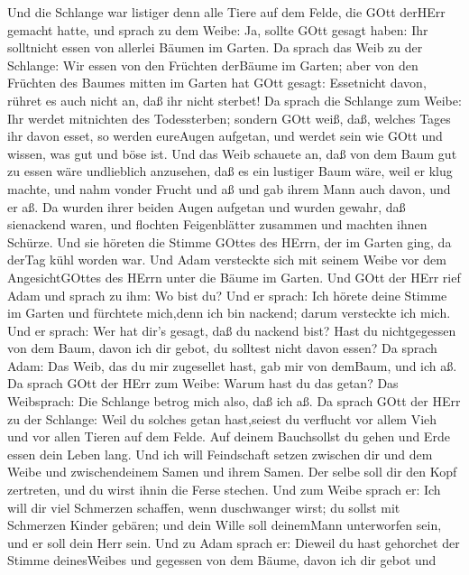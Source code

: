  Und die Schlange war listiger denn alle Tiere auf dem
Felde, die GOtt derHErr gemacht hatte, und sprach zu dem Weibe: Ja,
sollte GOtt gesagt haben: Ihr solltnicht essen von allerlei Bäumen im
Garten.  Da sprach das Weib zu der Schlange: Wir essen von
den Früchten derBäume im Garten;  aber von den Früchten des
Baumes mitten im Garten hat GOtt gesagt: Essetnicht davon, rühret es
auch nicht an, daß ihr nicht sterbet!  Da sprach die
Schlange zum Weibe: Ihr werdet mitnichten des Todessterben; 
sondern GOtt weiß, daß, welches Tages ihr davon esset, so werden
eureAugen aufgetan, und werdet sein wie GOtt und wissen, was gut und
böse ist.  Und das Weib schauete an, daß von dem Baum gut zu
essen wäre undlieblich anzusehen, daß es ein lustiger Baum wäre, weil er
klug machte, und nahm vonder Frucht und aß und gab ihrem Mann auch
davon, und er aß.  Da wurden ihrer beiden Augen aufgetan und
wurden gewahr, daß sienackend waren, und flochten Feigenblätter zusammen
und machten ihnen Schürze.  Und sie höreten die Stimme
GOttes des HErrn, der im Garten ging, da derTag kühl worden war. Und
Adam versteckte sich mit seinem Weibe vor dem AngesichtGOttes des HErrn
unter die Bäume im Garten.  Und GOtt der HErr rief Adam und
sprach zu ihm: Wo bist du?  Und er sprach: Ich hörete deine
Stimme im Garten und fürchtete mich,denn ich bin nackend; darum
versteckte ich mich.  Und er sprach: Wer hat dir's gesagt,
daß du nackend bist? Hast du nichtgegessen von dem Baum, davon ich dir
gebot, du solltest nicht davon essen?  Da sprach Adam: Das
Weib, das du mir zugesellet hast, gab mir von demBaum, und ich aß.
 Da sprach GOtt der HErr zum Weibe: Warum hast du das
getan? Das Weibsprach: Die Schlange betrog mich also, daß ich aß.
 Da sprach GOtt der HErr zu der Schlange: Weil du solches
getan hast,seiest du verflucht vor allem Vieh und vor allen Tieren auf
dem Felde. Auf deinem Bauchsollst du gehen und Erde essen dein Leben
lang.  Und ich will Feindschaft setzen zwischen dir und dem
Weibe und zwischendeinem Samen und ihrem Samen. Der selbe soll dir den
Kopf zertreten, und du wirst ihnin die Ferse stechen.  Und
zum Weibe sprach er: Ich will dir viel Schmerzen schaffen, wenn
duschwanger wirst; du sollst mit Schmerzen Kinder gebären; und dein
Wille soll deinemMann unterworfen sein, und er soll dein Herr sein.
 Und zu Adam sprach er: Dieweil du hast gehorchet der
Stimme deinesWeibes und gegessen von dem Bäume, davon ich dir gebot und
